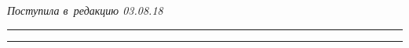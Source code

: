 \vspace*{-6pt}





\hfill{\small\textit{Поступила в~редакцию 03.08.18}}














\vspace*{6pt}





\hrule





\vspace*{2pt}















\hrule
















\def\tit{FUZZY STRING COMPARISON\\ WHEN~PROCESSING PERSONAL DATA}





\def\titkol{Fuzzy string comparison when~processing personal data}











\def\aut{O.\,V.~Bobyleva$^1$, 


I.\,S.~Bekesheva$^1$, V.\,A.~Bobylev$^2$, and~V.\,V.~Charkova$^1$}





\def\autkol{O.\,V.~Bobyleva, 


I.\,S.~Bekesheva, V.\,A.~Bobylev, and~V.\,V.~Charkova}











